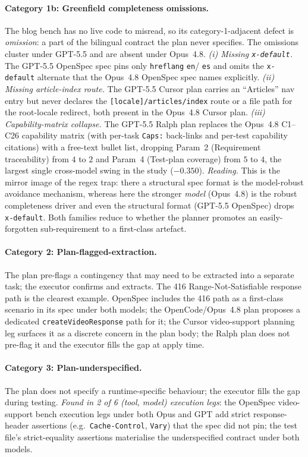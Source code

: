 \paragraph{Category 1b: Greenfield completeness omissions.}
The blog bench has no live code to misread, so its
category-1-adjacent defect is \emph{omission}: a part of the bilingual
contract the plan never specifies. The omissions cluster under GPT-5.5
and are absent under Opus~4.8. \emph{(i) Missing \texttt{x-default}.}
The GPT-5.5 OpenSpec spec pins only \texttt{hreflang} \texttt{en}/%
\texttt{es} and omits the \texttt{x-default} alternate that the
Opus~4.8 OpenSpec spec names explicitly. \emph{(ii) Missing
article-index route.} The GPT-5.5 Cursor plan carries an ``Articles''
nav entry but never declares the \texttt{[locale]/articles/index}
route or a file path for the root-locale redirect, both present in the
Opus~4.8 Cursor plan. \emph{(iii) Capability-matrix collapse.} The
GPT-5.5 Ralph plan replaces the Opus~4.8 C1--C26 capability matrix
(with per-task \texttt{Caps:} back-links and per-test capability
citations) with a free-text bullet list, dropping Param~2
(Requirement traceability) from $4$ to $2$ and Param~4 (Test-plan
coverage) from $5$ to $4$, the largest single cross-model swing in
the study ($-0.350$). \emph{Reading.} This is the mirror image of the
regex trap: there a structural spec format is the model-robust
avoidance mechanism, whereas here the stronger \emph{model} (Opus~4.8)
is the robust completeness driver and even the structural format
(GPT-5.5 OpenSpec) drops \texttt{x-default}. Both families reduce to
whether the planner promotes an easily-forgotten sub-requirement to a
first-class artefact.

\paragraph{Category 2: Plan-flagged-extraction.}
The plan pre-flags a contingency that may need to be extracted into a
separate task; the executor confirms and extracts. The 416
Range-Not-Satisfiable response path is the clearest example. OpenSpec
includes the 416 path as a first-class scenario in its spec under both
models; the OpenCode/Opus~4.8 plan proposes a dedicated
\texttt{createVideoResponse} path for it; the Cursor video-support planning
leg surfaces it as a discrete concern in the plan body; the Ralph plan
does not pre-flag it and the executor fills the gap at apply time.

\paragraph{Category 3: Plan-underspecified.}
The plan does not specify a runtime-specific behaviour; the executor
fills the gap during testing. \emph{Found in 2 of 6 (tool, model)
execution legs}: the OpenSpec video-support bench execution legs under
both Opus and GPT add strict response-header assertions
(e.g.\ \texttt{Cache-Control}, \texttt{Vary}) that the spec did not
pin; the test file's strict-equality assertions materialise the
underspecified contract under both models.

